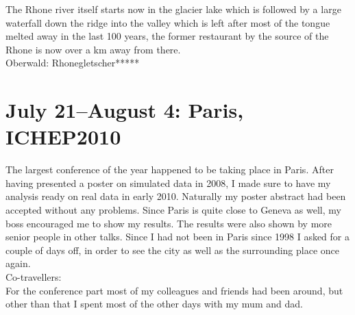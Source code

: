 The Rhone river itself starts now in the glacier lake which is followed by a large waterfall down the ridge into the valley which is left after most of the tongue melted away in the last 100 years, the former restaurant by the source of the Rhone is now over a km away from there.\\

Oberwald: Rhonegletscher*****

\section{July 21--August 4: Paris, ICHEP2010}
\label{Paris2010}

The largest conference of the year happened to be taking place in Paris. After having presented a poster on simulated data in 2008, I made sure to have my analysis ready on real data in early 2010. Naturally my poster abstract had been accepted without any problems. Since Paris is quite close to Geneva as well, my boss encouraged me to show my results. The results were also shown by more senior people in other talks. Since I had not been in Paris since 1998 I asked for a couple of days off, in order to see the city as well as the surrounding place once again.\\

Co-travellers:\\
For the conference part most of my colleagues and friends had been around, but other than that I spent most of the other days with my mum and dad.\\

